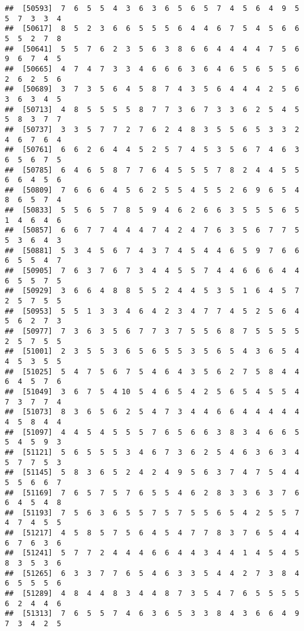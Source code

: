 \documentclass[
]{book}
\begin{document}
\begin{verbatim}
##  [50593]  7  6  5  5  4  3  6  3  6  5  6  5  7  4  5  6  4  9  5  5  7  3  3  4
##  [50617]  8  5  2  3  6  6  5  5  5  6  4  4  6  7  5  4  5  6  6  5  5  2  7  8
##  [50641]  5  5  7  6  2  3  5  6  3  8  6  6  4  4  4  4  7  5  6  9  6  7  4  5
##  [50665]  4  7  4  7  3  3  4  6  6  6  3  6  4  6  5  6  5  5  6  2  6  2  5  6
##  [50689]  3  7  3  5  6  4  5  8  7  4  3  5  6  4  4  4  2  5  6  3  6  3  4  5
##  [50713]  4  8  5  5  5  5  8  7  7  3  6  7  3  3  6  2  5  4  5  5  8  3  7  7
##  [50737]  3  3  5  7  7  2  7  6  2  4  8  3  5  5  6  5  3  3  2  4  6  7  6  4
##  [50761]  6  6  2  6  4  4  5  2  5  7  4  5  3  5  6  7  4  6  3  6  5  6  7  5
##  [50785]  6  4  6  5  8  7  7  6  4  5  5  5  7  8  2  4  4  5  5  6  6  4  5  6
##  [50809]  7  6  6  6  4  5  6  2  5  5  4  5  5  2  6  9  6  5  4  8  6  5  7  4
##  [50833]  5  5  6  5  7  8  5  9  4  6  2  6  6  3  5  5  5  6  5  1  4  6  4  6
##  [50857]  6  6  7  7  4  4  4  7  4  2  4  7  6  3  5  6  7  7  5  5  3  6  4  3
##  [50881]  5  3  4  5  6  7  4  3  7  4  5  4  4  6  5  9  7  6  6  6  5  5  4  7
##  [50905]  7  6  3  7  6  7  3  4  4  5  5  7  4  4  6  6  6  4  4  6  5  5  7  5
##  [50929]  3  6  6  4  8  8  5  5  2  4  4  5  3  5  1  6  4  5  7  2  5  7  5  5
##  [50953]  5  5  1  3  3  4  6  4  2  3  4  7  7  4  5  2  5  6  4  5  6  2  7  3
##  [50977]  7  3  6  3  5  6  7  7  3  7  5  5  6  8  7  5  5  5  5  2  5  7  5  5
##  [51001]  2  3  5  5  3  6  5  6  5  5  3  5  6  5  4  3  6  5  4  4  5  3  5  5
##  [51025]  5  4  7  5  6  7  5  4  6  4  3  5  6  2  7  5  8  4  4  6  4  5  7  6
##  [51049]  3  6  7  5  4 10  5  4  6  5  4  2  5  6  5  4  5  5  4  7  3  7  7  4
##  [51073]  8  3  6  5  6  2  5  4  7  3  4  4  6  6  4  4  4  4  4  4  5  8  4  4
##  [51097]  4  4  5  4  5  5  5  7  6  5  6  6  3  8  3  4  6  6  5  5  4  5  9  3
##  [51121]  5  6  5  5  5  3  4  6  7  3  6  2  5  4  6  3  6  3  4  5  7  7  5  3
##  [51145]  5  8  3  6  5  2  4  2  4  9  5  6  3  7  4  7  5  4  4  5  5  6  6  7
##  [51169]  7  6  5  7  5  7  6  5  5  4  6  2  8  3  3  6  3  7  6  6  4  5  4  8
##  [51193]  7  5  6  3  6  5  5  7  5  7  5  5  6  5  4  2  5  5  7  4  7  4  5  5
##  [51217]  4  5  8  5  7  5  6  4  5  4  7  7  8  3  7  6  5  4  4  6  7  6  3  6
##  [51241]  5  7  7  2  4  4  4  6  6  4  4  3  4  4  1  4  5  4  5  8  3  5  3  6
##  [51265]  6  3  3  7  7  6  5  4  6  3  3  5  4  4  2  7  3  8  4  6  5  5  5  6
##  [51289]  4  8  4  4  8  3  4  4  8  7  3  5  4  7  6  5  5  5  5  6  2  4  4  6
##  [51313]  7  6  5  5  7  4  6  3  6  5  3  3  8  4  3  6  6  4  9  7  3  4  2  5

\end{verbatim}
\end{document}
